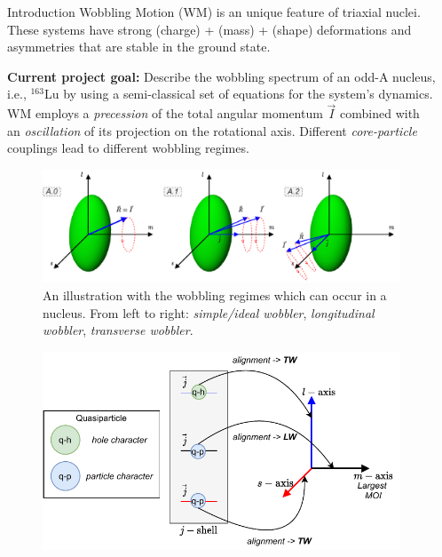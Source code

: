 \documentclass[final]{beamer}
\newlength{\sepwidth}
\newlength{\colwidth}
\newcommand{\separatorcolumn}{\begin{column}{\sepwidth}\end{column}}
\begin{document}
\begin{frame}[t]
\begin{columns}[t]
\separatorcolumn
\begin{column}{\colwidth}
  \begin{block}{Introduction}
Wobbling Motion (WM) is an unique feature of triaxial nuclei. These systems have strong (charge) + (mass) + (shape) deformations and asymmetries that are stable in the ground state.

\textbf{Current project goal:} Describe the wobbling spectrum of an odd-A nucleus, i.e., $^{163}$Lu by using a semi-classical set of equations for the system's dynamics.
  WM employs a \emph{precession} of the total angular momentum $\vec{I}$ combined with an \emph{oscillation} of its projection on the rotational axis. Different \emph{core-particle} couplings lead to different wobbling regimes.
  \begin{figure}
      \centering
     \includegraphics[scale=1.5]{images/wobbling_Regimes_COUPLING_SCHEME.pdf}
      \caption{An illustration with the wobbling regimes which can occur in a nucleus. From left to right: \emph{simple/ideal wobbler}, \emph{longitudinal wobbler}, \emph{transverse wobbler}.}
      \label{wobbling-regimes}
  \end{figure}
  \begin{figure}
      \centering
     \includegraphics[scale=2.3]{images/wobbling_Regimes_updated.pdf}

\end{figure}
\end{block}
\end{column}
\end{columns}
\end{frame}
\end{document}
